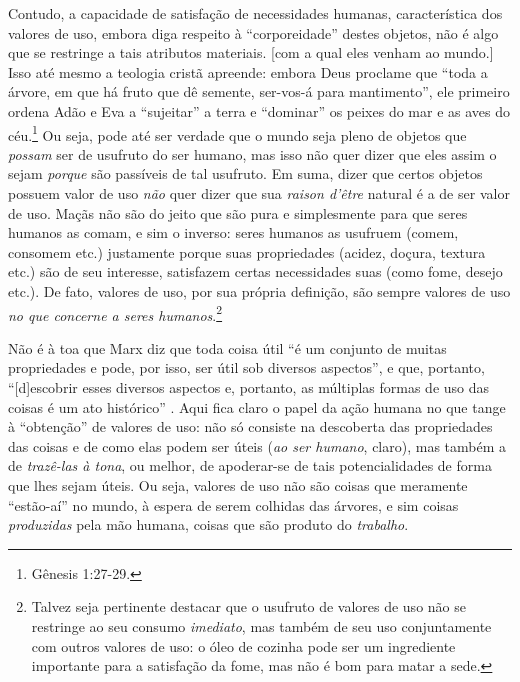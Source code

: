 \documentclass[12pt]{article}
\begin{document}
Contudo, a capacidade de satisfação de necessidades humanas, característica dos valores de uso, embora diga respeito à ``corporeidade'' destes objetos, não é algo que se restringe a tais atributos materiais. [com a qual eles venham ao mundo.] Isso até mesmo a teologia cristã apreende: embora Deus proclame que ``toda a árvore, em que há fruto que dê semente, ser-vos-á para mantimento'', ele primeiro ordena Adão e Eva a ``sujeitar'' a terra e ``dominar'' os peixes do mar e as aves do céu.\footnote{Gênesis 1:27-29.} Ou seja, pode até ser verdade que o mundo seja pleno de objetos que \textit{possam} ser de usufruto do ser humano, mas isso não quer dizer que eles assim o sejam \textit{porque} são passíveis de tal usufruto. Em suma, dizer que certos objetos possuem valor de uso \textit{não} quer dizer que sua \textit{raison d'être} natural é a de ser valor de uso. Maçãs não são do jeito que são pura e simplesmente para que seres humanos as comam, e sim o inverso: seres humanos as usufruem (comem, consomem etc.) justamente porque suas propriedades (acidez, doçura, textura etc.) são de seu interesse, satisfazem certas necessidades suas (como fome, desejo etc.). De fato, valores de uso, por sua própria definição, são sempre valores de uso \textit{no que concerne a seres humanos}.\footnote{Talvez seja pertinente destacar que o usufruto de valores de uso não se restringe ao seu consumo \textit{imediato}, mas também de seu uso conjuntamente com outros valores de uso: o óleo de cozinha pode ser um ingrediente importante para a satisfação da fome, mas não é bom para matar a sede.}

Não é à toa que Marx diz que toda coisa útil ``é um conjunto de muitas propriedades e pode, por isso, ser útil sob diversos aspectos'', e que, portanto, ``[d]escobrir esses diversos aspectos e, portanto, as múltiplas formas de uso das coisas é um ato histórico'' \parencite[p. 113]{Marx2017}. Aqui fica claro o papel da ação humana no que tange à ``obtenção'' de valores de uso: não só consiste na descoberta das propriedades das coisas e de como elas podem ser úteis (\textit{ao ser humano}, claro), mas também a de \textit{trazê-las à tona}, ou melhor, de apoderar-se de tais potencialidades de forma que lhes sejam úteis. Ou seja, valores de uso não são coisas que meramente ``estão-aí'' no mundo, à espera de serem colhidas das árvores, e sim coisas \textit{produzidas} pela mão humana, coisas que são produto do \textit{trabalho}.
\end{document}
